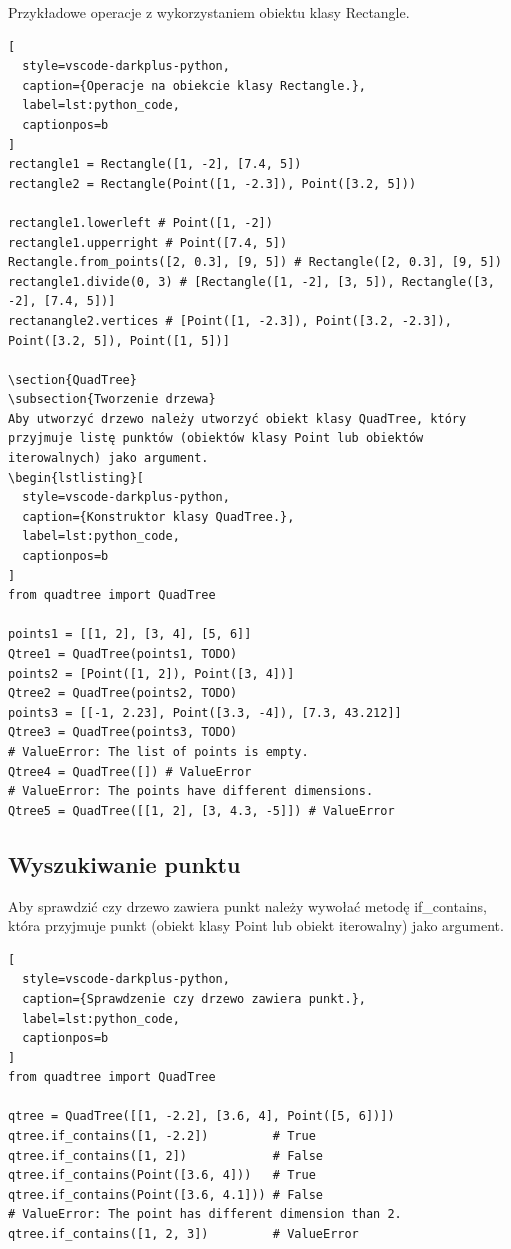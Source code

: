 \documentclass{lab}
\begin{document}
Przykładowe operacje z wykorzystaniem obiektu klasy Rectangle.

\begin{lstlisting}[
  style=vscode-darkplus-python,
  caption={Operacje na obiekcie klasy Rectangle.},
  label=lst:python_code,
  captionpos=b
]
rectangle1 = Rectangle([1, -2], [7.4, 5])
rectangle2 = Rectangle(Point([1, -2.3]), Point([3.2, 5]))

rectangle1.lowerleft # Point([1, -2])
rectangle1.upperright # Point([7.4, 5])
Rectangle.from_points([2, 0.3], [9, 5]) # Rectangle([2, 0.3], [9, 5])
rectangle1.divide(0, 3) # [Rectangle([1, -2], [3, 5]), Rectangle([3, -2], [7.4, 5])]
rectanangle2.vertices # [Point([1, -2.3]), Point([3.2, -2.3]), Point([3.2, 5]), Point([1, 5])]

\section{QuadTree}
\subsection{Tworzenie drzewa}
Aby utworzyć drzewo należy utworzyć obiekt klasy QuadTree, który przyjmuje listę punktów (obiektów klasy Point lub obiektów iterowalnych) jako argument.
\begin{lstlisting}[
  style=vscode-darkplus-python,
  caption={Konstruktor klasy QuadTree.},
  label=lst:python_code,
  captionpos=b
]
from quadtree import QuadTree

points1 = [[1, 2], [3, 4], [5, 6]]
Qtree1 = QuadTree(points1, TODO)
points2 = [Point([1, 2]), Point([3, 4])]
Qtree2 = QuadTree(points2, TODO)
points3 = [[-1, 2.23], Point([3.3, -4]), [7.3, 43.212]]
Qtree3 = QuadTree(points3, TODO)
# ValueError: The list of points is empty.
Qtree4 = QuadTree([]) # ValueError
# ValueError: The points have different dimensions.
Qtree5 = QuadTree([[1, 2], [3, 4.3, -5]]) # ValueError
\end{lstlisting}

\subsection{Wyszukiwanie punktu}
Aby sprawdzić czy drzewo zawiera punkt należy wywołać metodę if\_contains, która przyjmuje punkt (obiekt klasy Point lub obiekt iterowalny) jako argument.

\begin{lstlisting}[
  style=vscode-darkplus-python,
  caption={Sprawdzenie czy drzewo zawiera punkt.},
  label=lst:python_code,
  captionpos=b
]
from quadtree import QuadTree

qtree = QuadTree([[1, -2.2], [3.6, 4], Point([5, 6])])
qtree.if_contains([1, -2.2])         # True
qtree.if_contains([1, 2])            # False
qtree.if_contains(Point([3.6, 4]))   # True
qtree.if_contains(Point([3.6, 4.1])) # False
# ValueError: The point has different dimension than 2.
qtree.if_contains([1, 2, 3])         # ValueError
\end{lstlisting}
\end{document}
